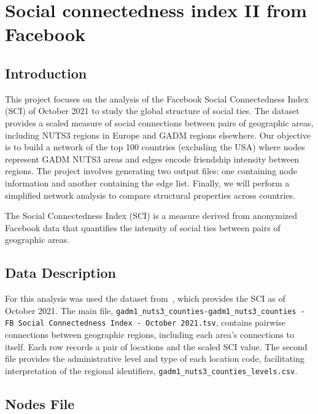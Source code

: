 

\chapter{Social connectedness index II from Facebook}




\section{Introduction}

This project focuses on the analysis of the Facebook Social Connectedness Index (SCI) of October 2021 to study the global structure of social ties. The dataset provides a scaled measure of social connections between pairs of geographic areas, including NUTS3 regions in Europe and GADM regions elsewhere. Our objective is to build a network of the top 100 countries (excluding the USA) where nodes represent GADM NUTS3 areas and edges encode friendship intensity between regions. The project involves generating two output files: one containing node information and another containing the edge list. Finally, we will perform a simplified network analysis to compare structural properties across countries.

The Social Connectedness Index (SCI) is a measure derived from anonymized Facebook data that quantifies the intensity of social ties between pairs of geographic areas. 

\section{Data Description}

For this analysis was used the dataset from~\cite{facebook2025sci}, which provides the SCI as of October 2021. The main file, \texttt{gadm1\_nuts3\_counties-gadm1\_nuts3\_counties - FB Social Connectedness Index - October 2021.tsv}, contains pairwise connections between geographic regions, including each area's connections to itself. Each row records a pair of locations and the scaled SCI value. The second file provides the administrative level and type of each location code, facilitating interpretation of the regional identifiers, \texttt{gadm1\_nuts3\_counties\_levels.csv}.

\section{Nodes File}

